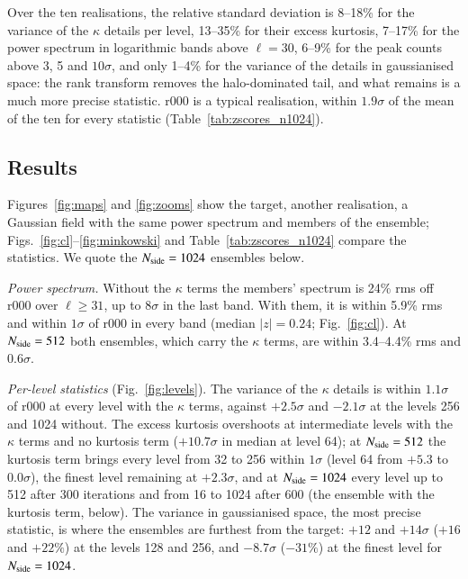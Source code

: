 \documentclass{aa}
\newcommand{\nsidefig}{1024}
\newcommand{\nside}{N_{\rm side}}
\begin{document}
Over the ten realisations, the relative standard deviation is 8--18\% for the variance of the $\kappa$ details per level, 13--35\% for their excess kurtosis, 7--17\% for the power spectrum in logarithmic bands above $\ell=30$, 6--9\% for the peak counts above 3, 5 and $10\sigma$, and only 1--4\% for the variance of the details in gaussianised space: the rank transform removes the halo-dominated tail, and what remains is a much more precise statistic. r000 is a typical realisation, within $1.9\sigma$ of the mean of the ten for every statistic (Table~\ref{tab:zscores_n\nsidefig}).

\subsection{Results}
\label{sec:results}

Figures~\ref{fig:maps} and \ref{fig:zooms} show the target, another realisation, a Gaussian field with the same power spectrum and members of the ensemble; Figs.~\ref{fig:cl}--\ref{fig:minkowski} and Table~\ref{tab:zscores_n\nsidefig} compare the statistics. We quote the $\nside=1024$ ensembles below. %

\emph{Power spectrum.} Without the $\kappa$ terms the members' spectrum is 24\% rms off r000 over $\ell\geq31$, up to $8\sigma$ in the last band. With them, it is within 5.9\% rms and within $1\sigma$ of r000 in every band (median $|z|=0.24$; Fig.~\ref{fig:cl}). At $\nside=512$ both ensembles, which carry the $\kappa$ terms, are within 3.4--4.4\% rms and $0.6\sigma$. %

\emph{Per-level statistics} (Fig.~\ref{fig:levels}). The variance of the $\kappa$ details is within $1.1\sigma$ of r000 at every level with the $\kappa$ terms, against $+2.5\sigma$ and $-2.1\sigma$ at the levels 256 and 1024 without. The excess kurtosis overshoots at intermediate levels with the $\kappa$ terms and no kurtosis term ($+10.7\sigma$ in median at level 64); at $\nside=512$ the kurtosis term brings every level from 32 to 256 within $1\sigma$ (level 64 from $+5.3$ to $0.0\sigma$), the finest level remaining at $+2.3\sigma$, and at $\nside=1024$ every level up to 512 after 300 iterations and from 16 to 1024 after 600 (the ensemble with the kurtosis term, below). The variance in gaussianised space, the most precise statistic, is where the ensembles are furthest from the target: $+12$ and $+14\sigma$ ($+16$ and $+22\%$) at the levels 128 and 256, and $-8.7\sigma$ ($-31\%$) at the finest level for $\nside=1024$. %
\end{document}
